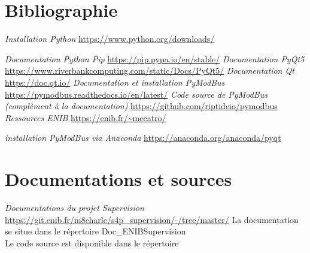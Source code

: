 


\chapter{Bibliographie}

\bibitem{}
	  \emph{Installation Python} \newline
	  \url{https://www.python.org/downloads/}
	  
\bibitem{}
	  \emph{Documentation Python Pip} \newline
      \url{https://pip.pypa.io/en/stable/}
\bibitem{}
	  \emph{Documentation PyQt5} \newline
	  \url{https://www.riverbankcomputing.com/static/Docs/PyQt5/}
\bibitem{}
	  \emph{Documentation Qt} \newline
	  \url{https://doc.qt.io/}
\bibitem{}
	  \emph{Documentation et installation PyModBus} \newline
	  \url{https://pymodbus.readthedocs.io/en/latest/}
\bibitem{}
    \emph{Code source de PyModBus (complèment à la documentation)}\newline
    \url{https://github.com/riptideio/pymodbus}
\bibitem{}
	  \emph{Ressources ENIB} \newline
	  \url{https://enib.fr/~mecatro/}

\bibitem{}
	  \emph{ installation PyModBus via Anaconda} \newline
	  \url{https://anaconda.org/anaconda/pyqt}

\chapter{Documentations et sources}

\bibitem{}
    \emph{Documentations du projet Supervision}\newline
    \url{https://git.enib.fr/m8charle/s4p_supervision/-/tree/master/} \newline
    La documentation se situe dans le répertoire Doc\_ENIBSupervision \\
    Le code source est disponible dans le répertoire 


